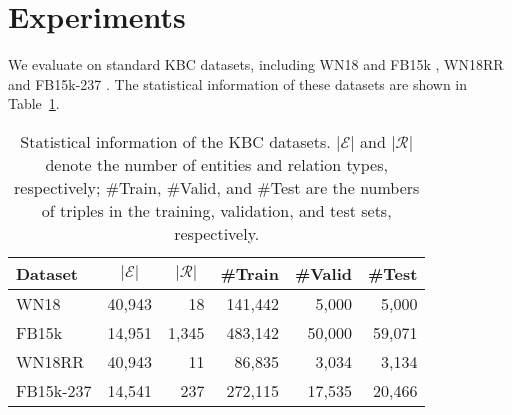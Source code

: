 \documentclass[11pt,a4paper]{article}
\newcommand{\setofents}{\mathcal{E}}
\newcommand{\setofrels}{\mathcal{R}}
\begin{document}
\section{Experiments}

We evaluate on standard KBC datasets, 
including WN18 and FB15k \citep{DBLP:conf/nips/BordesUGWY13}, 
WN18RR \citep{dettmers2018conve} and FB15k-237 \citep{toutanova-chen:2015:CVSC}.
The statistical information of these datasets are shown 
in Table~\ref{tab:datasets}.

\begin{table}[t]
\centering
\setlength{\tabcolsep}{4pt}
\small
\begin{tabular}{lrrrrr}
\toprule
Dataset & \multicolumn{1}{c}{$\lvert\setofents\rvert$} & \multicolumn{1}{c}{$\lvert\setofrels\rvert$} & \multicolumn{1}{c}{\#Train} & \multicolumn{1}{c}{\#Valid} & \multicolumn{1}{c}{\#Test} \\
\midrule
WN18 & 40,943 & 18 & 141,442 & 5,000 & 5,000 \\
FB15k & 14,951 & 1,345 & 483,142 & 50,000 & 59,071 \\
WN18RR & 40,943 & 11 & 86,835 & 3,034 & 3,134 \\
FB15k-237 & 14,541 & 237 & 272,115 & 17,535 & 20,466 \\
\bottomrule
\end{tabular}
\caption{%
Statistical information of the KBC datasets.
$\lvert\setofents\rvert$ and $\lvert\setofrels\rvert$ denote the number of 
entities and relation types, respectively; 
\#Train, \#Valid, and \#Test are the numbers of triples
in the training, validation, and test sets, respectively.}
\label{tab:datasets}
\end{table}
\end{document}
